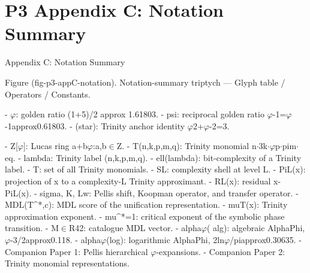 
\section{P3 Appendix C: Notation Summary}

Appendix C: Notation Summary

  Figure (fig-p3-appC-notation). Notation-summary triptych --- Glyph table / Operators / Constants.

  - $\varphi$: golden ratio (1+5)/2 approx 1.61803.
  - psi: reciprocal golden ratio $\varphi$-1=$\varphi$-1approx0.61803.
  - (star): Trinity anchor identity $\varphi$2+$\varphi$-2=3.

  - Z[$\varphi$]: Lucas ring {a+b$\varphi$:a,b$\in$Z}.
  - T(n,k,p,m,q): Trinity monomial n$\cdot$3k$\cdot\varphi$p$\cdot$pim$\cdot$ eq.
  - lambda: Trinity label (n,k,p,m,q).
  - ell(lambda): bit-complexity of a Trinity label.
  - T: set of all Trinity monomials.
  - SL: complexity shell at level L.
  - PiL(x): projection of x to a complexity-L Trinity approximant.
  - RL(x): residual x-PiL(x).
  - sigma, K, Lw: Pellis shift, Koopman operator, and transfer operator.
  - MDL(T\textasciicircum{}*,c): MDL score of the unification representation.
  - muT(x): Trinity approximation exponent.
  - mu\textasciicircum{}*=1: critical exponent of the symbolic phase transition.
  - M$\in$R42: catalogue MDL vector.
  - alpha$\varphi$( alg): algebraic AlphaPhi, $\varphi$-3/2approx0.118.
  - alpha$\varphi$(log): logarithmic AlphaPhi, 2ln$\varphi$/piapprox0.30635.
  - Companion Paper 1: Pellis hierarchical $\varphi$-expansions.
  - Companion Paper 2: Trinity monomial representations.